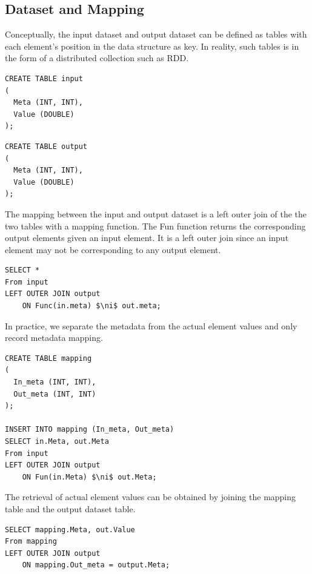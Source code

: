 \documentclass{sig-alternate}
\begin{document}
\subsection{Dataset and Mapping}
\label{sec:formal-ds-mapping}
Conceptually, the input dataset and output dataset can be defined
as tables with each element's position in the data structure as key.
In reality, such tables is in the form of a distributed collection such as RDD.
\newline\newline
\noindent\begin{minipage}{\textwidth}
\noindent\begin{minipage}{.2\textwidth}
\begin{verbatim}
CREATE TABLE input
(
  Meta (INT, INT),
  Value (DOUBLE)
);
\end{verbatim}
\end{minipage} 
\qquad{\color{black}\vrule}\qquad
\begin{minipage}{.2\textwidth}
\begin{verbatim}
CREATE TABLE output
(
  Meta (INT, INT),
  Value (DOUBLE)
);
\end{verbatim}
\end{minipage}
\end{minipage}
\vspace{2ex}

The mapping between the input and output dataset is a left outer join of the the two tables with a mapping function.
The Fun function returns the corresponding output elements given an input element. 
It is a left outer join since an input element may not be corresponding to any output element.
\begin{lstlisting}
SELECT *
From input
LEFT OUTER JOIN output 
    ON Func(in.meta) $\ni$ out.meta;
\end{lstlisting}

In practice, we separate the metadata from the actual element values and only record metadata mapping.
\begin{lstlisting}
CREATE TABLE mapping
(
  In_meta (INT, INT),
  Out_meta (INT, INT)
);

INSERT INTO mapping (In_meta, Out_meta)
SELECT in.Meta, out.Meta
From input
LEFT OUTER JOIN output 
    ON Fun(in.Meta) $\ni$ out.Meta;
\end{lstlisting}
The retrieval of actual element values can be obtained by joining the mapping table and the output dataset table.
\begin{lstlisting}
SELECT mapping.Meta, out.Value
From mapping
LEFT OUTER JOIN output 
    ON mapping.Out_meta = output.Meta;
\end{lstlisting}
\end{document}

